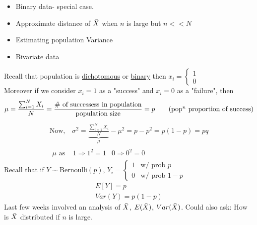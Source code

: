 \begin{itemize}
	\item Binary data- special case.
	\item Approximate distance of $\bar{X}$ when $n$ is large but $n << N$
	\item Estimating population Variance
	\item Bivariate data
\end{itemize}
Recall that population is \underline{dichotomous} or \underline{binary} then $x_i = \begin{cases}
	1\\0
\end{cases}$\\
Moreover if we consider $x_i = 1$ as a "success" and $x_i = 0$ as a "failure", then
\begin{equation*}
	\mu = \frac{\sum_{i=1}^N X_i}{N} = \frac{\text{\# of successess in population}}{\text{population size}} = p \tag{$\text{pop}^n$ proportion of success}
\end{equation*}
\begin{gather*}
	\text{Now,} \quad \sigma^2 = \underbrace{\frac{\sum_{i=1}^N X_i}{N}}_{\mu} - \mu^2 = p - p^2 = p(1-p) = pq\\ \begin{align*}
				\mu \text{ as } & 1 \Rightarrow 1^2 = 1
				& 0 \Rightarrow 0^2 = 0
	\end{align*}
\end{gather*}
Recall that if $Y \sim \text{Bernoulli}(p)$, $Y_i = \begin{cases}
	1 & \text{w/ prob } p\\0 & \text{w/ prob } 1-p
\end{cases}$\\
\begin{gather*}
	E[Y] = p\\
	Var(Y) = p(1-p)
\end{gather*}
Last few weeks involved an analysis of $\bar{X}$, $E(\bar{X})$, $Var(\bar{X})$. Could also ask: How is $\bar{X}$ distributed if $n$ is large.
